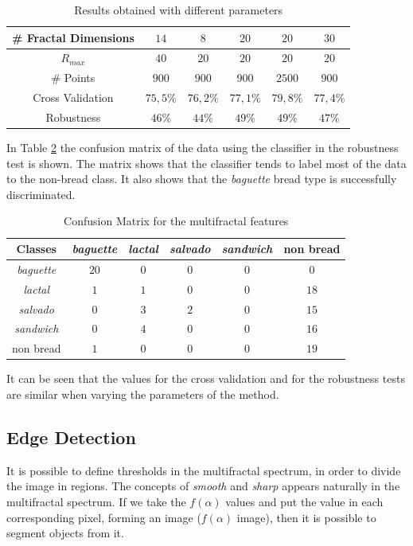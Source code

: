 \documentclass[oneside,a4paper,english,links,12pt]{article}
\begin{document}
\begin{table}[htb]
\centering
\begin{tabular}{|c|c|c|c|c|c|}
    \hline
    \# Fractal Dimensions & $14$ & $8$ & $20$ & $20$ & $30$\\
    \hline
    $R_{max}$ & $40$ & $20$ & $20$ & $20$ & $20$\\
    \hline
    \# Points & $900$ & $900$ & $900$ & $2500$ & $900$\\
    \hline
    Cross Validation  & $75,5\%$ & $76,2\%$ & $77,1\%$ & $79,8\%$ & $77,4\%$\\
    \hline
    Robustness & $46\%$ & $44\%$ & $49\%$ & $49\%$ & $47\%$ \\
    \hline
\end{tabular}
\caption{Results obtained with different parameters}
\label{table:tableFirstTest}
\end{table}


In Table \ref{table:ConfusionMatrixFractal} the confusion matrix of the data using the classifier in the robustness test is shown. The matrix shows that the classifier tends to label most of the data to the non-bread class. It also shows that the {\em baguette} bread type is successfully discriminated.
\begin{table}[htb]
\centering
\begin{tabular}{|c|c|c|c|c|c|}
    \hline
    Classes & {\em baguette} & {\em lactal} & {\em salvado} & {\em sandwich} & non bread\\
    \hline
    \hline
    {\em baguette}  & $20$ & $0$ & $0$ & $0$  & $0$\\
    \hline
    {\em lactal}    & $1$ & $1$ & $0$ & $0$  & $18$\\
    \hline
    {\em salvado}   & $0$ & $3$ & $2$ & $0$  & $15$\\
    \hline
    {\em sandwich}  & $0$ & $4$  & $0$ & $0$ & $16$\\
    \hline
    non bread       & $1$ & $0$  & $0$ & $0$  & $19$\\
    \hline
\end{tabular}
\caption{Confusion Matrix for the multifractal features}
\label{table:ConfusionMatrixFractal}
\end{table}

It can be seen that the values for the cross validation and for the robustness tests are similar when varying the parameters of the method.

\subsection{Edge Detection}
It is possible to define thresholds in the multifractal spectrum, in order to divide the image in regions. The concepts of {\em smooth} and {\em sharp} appears naturally in the multifractal spectrum. If we take the $f(\alpha)$ values and put the value in each corresponding pixel, forming an image ($f(\alpha)$ image), then it is possible to segment objects from it.
\end{document}
